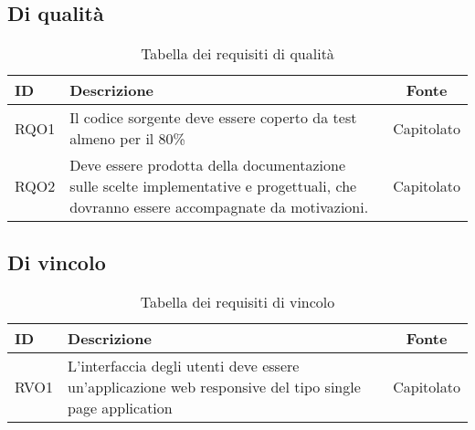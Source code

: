 \subsection{Di qualità}

\begin{table}[h]
	\renewcommand{\arraystretch}{1.5}
	\centering
	\begin{tabularx}{\textwidth}{l|X|c}
		\textbf{ID} & \textbf{Descrizione}                                                                                                                  & \textbf{Fonte} \\
		\hline
		RQO1        & Il codice sorgente deve essere coperto da test almeno per il 80\%                                                                     & Capitolato     \\
		\hline
		RQO2        & Deve essere prodotta della documentazione sulle scelte implementative e progettuali, che dovranno essere accompagnate da motivazioni. & Capitolato     \\
		\hline
	\end{tabularx}
	\caption{Tabella dei requisiti di qualità}
\end{table}

\subsection{Di vincolo}

\begin{table}[h]
	\renewcommand{\arraystretch}{1.5}
	\centering
	\begin{tabularx}{\textwidth}{l|X|c}
		\textbf{ID} & \textbf{Descrizione}                                                                                   & \textbf{Fonte} \\
		\hline
		RVO1        & L'interfaccia degli utenti deve essere un'applicazione web responsive del tipo single page application & Capitolato     \\
		\hline
	\end{tabularx}
	\caption{Tabella dei requisiti di vincolo}
\end{table}
